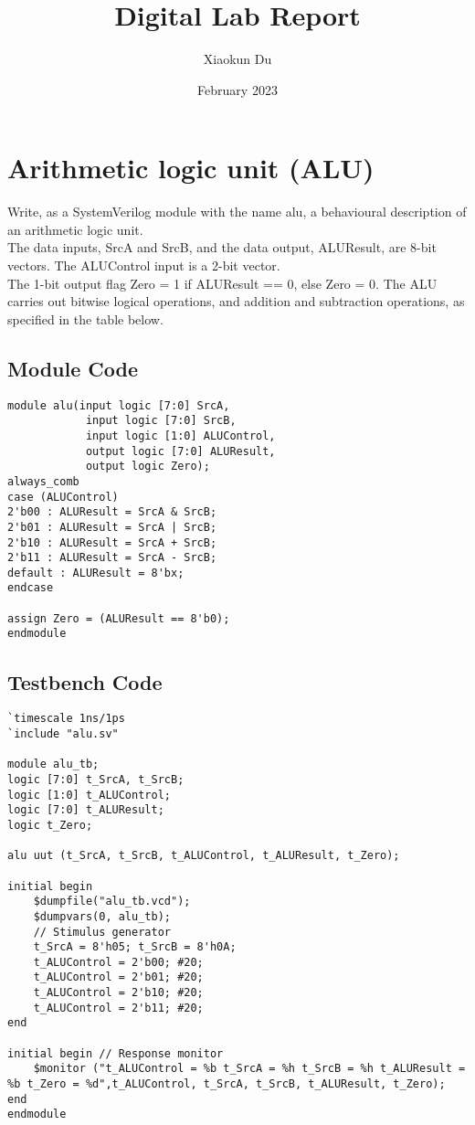 \documentclass{article}
\title{Digital Lab Report}
\author{Xiaokun Du}
\date{February 2023}
\begin{document}
\maketitle


\section{Arithmetic logic unit (ALU)}

Write, as a SystemVerilog module with the name alu, a behavioural description of an arithmetic logic unit. \\
The data inputs, SrcA and SrcB, and the data output, ALUResult, are 8-bit vectors. The ALUControl input is a 2-bit vector. \\
The 1-bit output flag Zero = 1 if ALUResult == 0, else Zero = 0. The ALU carries out bitwise logical operations, and addition and subtraction operations, as specified in the table below.
\subsection*{Module Code}
\begin{lstlisting}
module alu(input logic [7:0] SrcA,
            input logic [7:0] SrcB,
            input logic [1:0] ALUControl,
            output logic [7:0] ALUResult,
            output logic Zero);
always_comb
case (ALUControl)
2'b00 : ALUResult = SrcA & SrcB;
2'b01 : ALUResult = SrcA | SrcB;
2'b10 : ALUResult = SrcA + SrcB;
2'b11 : ALUResult = SrcA - SrcB;
default : ALUResult = 8'bx;
endcase

assign Zero = (ALUResult == 8'b0);
endmodule
\end{lstlisting}

\subsection*{Testbench Code}
\begin{lstlisting}
`timescale 1ns/1ps 
`include "alu.sv"

module alu_tb;
logic [7:0] t_SrcA, t_SrcB;
logic [1:0] t_ALUControl;
logic [7:0] t_ALUResult;
logic t_Zero;

alu uut (t_SrcA, t_SrcB, t_ALUControl, t_ALUResult, t_Zero);

initial begin
    $dumpfile("alu_tb.vcd"); 
    $dumpvars(0, alu_tb);
    // Stimulus generator
    t_SrcA = 8'h05; t_SrcB = 8'h0A;
    t_ALUControl = 2'b00; #20;
    t_ALUControl = 2'b01; #20;
    t_ALUControl = 2'b10; #20;
    t_ALUControl = 2'b11; #20;
end

initial begin // Response monitor
    $monitor ("t_ALUControl = %b t_SrcA = %h t_SrcB = %h t_ALUResult = %b t_Zero = %d",t_ALUControl, t_SrcA, t_SrcB, t_ALUResult, t_Zero);
end
endmodule

\end{lstlisting}
\end{document}

